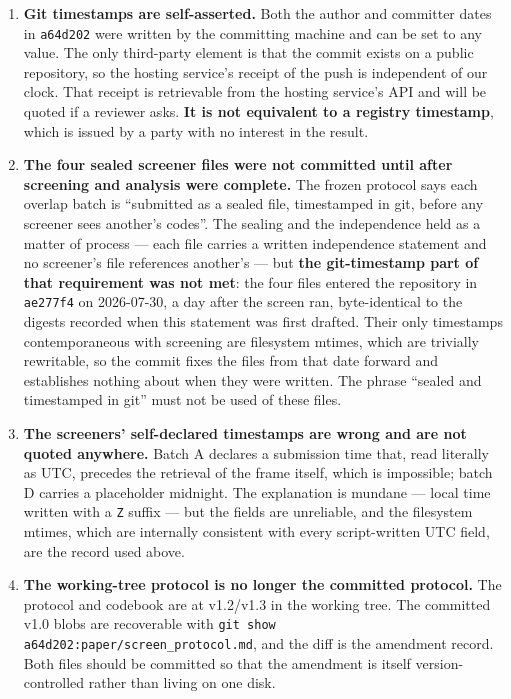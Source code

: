 \documentclass[11pt,a4paper]{article}
\begin{document}
\begin{enumerate}
\item \textbf{Git timestamps are self-asserted.} Both the author and committer dates in
\texttt{a64d202} were written by the committing machine and can be set to any value.
The only third-party element is that the commit exists on a public repository, so the
hosting service's receipt of the push is independent of our clock. That receipt is
retrievable from the hosting service's API and will be quoted if a reviewer asks.
\textbf{It is not equivalent to a registry timestamp}, which is issued by a party with
no interest in the result.

\item \textbf{The four sealed screener files were not committed until after screening
and analysis were complete.} The frozen protocol says each overlap batch is ``submitted
as a sealed file, timestamped in git, before any screener sees another's codes''. The
sealing and the independence held as a matter of process --- each file carries a written
independence statement and no screener's file references another's --- but \textbf{the
git-timestamp part of that requirement was not met}: the four files entered the
repository in \texttt{ae277f4} on 2026-07-30, a day after the screen ran, byte-identical
to the digests recorded when this statement was first drafted. Their only timestamps
contemporaneous with screening are filesystem mtimes, which are trivially rewritable, so
the commit fixes the files from that date forward and establishes nothing about when
they were written. The phrase ``sealed and timestamped in git'' must not be used of
these files.

\item \textbf{The screeners' self-declared timestamps are wrong and are not quoted
anywhere.} Batch A declares a submission time that, read literally as UTC, precedes the
retrieval of the frame itself, which is impossible; batch D carries a placeholder
midnight. The explanation is mundane --- local time written with a \texttt{Z} suffix
--- but the fields are unreliable, and the filesystem mtimes, which are internally
consistent with every script-written UTC field, are the record used above.

\item \textbf{The working-tree protocol is no longer the committed protocol.} The
protocol and codebook are at v1.2/v1.3 in the working tree. The committed v1.0 blobs
are recoverable with \texttt{git show a64d202:paper/screen\_protocol.md}, and the diff
is the amendment record. Both files should be committed so that the amendment is itself
version-controlled rather than living on one disk.
\end{enumerate}
\end{document}
